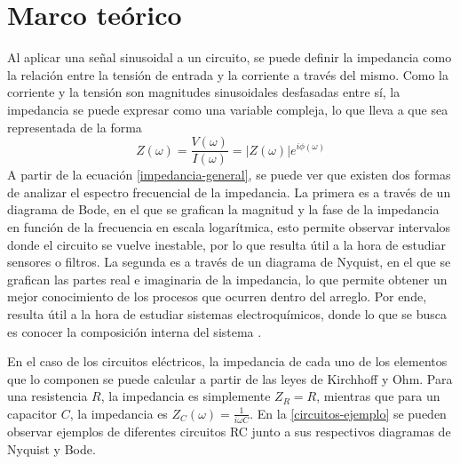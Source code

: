 \section{Marco teórico}
        Al aplicar una señal sinusoidal a un circuito, se puede definir la impedancia como la relación entre la tensión de entrada y la corriente a través del mismo. Como la corriente y la tensión son magnitudes sinusoidales desfasadas entre sí, la impedancia se puede expresar como una variable compleja, lo que lleva a que sea representada de la forma
        \begin{equation}
            Z(\omega) = \frac{V(\omega)}{I(\omega)} = |Z(\omega)|e^{i\phi(\omega)}
            \label{impedancia-general}
            \end{equation}
        A partir de la ecuación \eqref{impedancia-general}, se puede ver que existen dos formas de analizar el espectro frecuencial de la impedancia. La primera es a través de un diagrama de Bode, en el que se grafican la magnitud y la fase de la impedancia en función de la frecuencia en escala logarítmica, esto permite observar intervalos donde el circuito se vuelve inestable, por lo que resulta útil a la hora de estudiar sensores o filtros. La segunda es a través de un diagrama de Nyquist, en el que se grafican las partes real e imaginaria de la impedancia, lo que permite obtener un mejor conocimiento de los procesos que ocurren dentro del arreglo. Por ende, resulta útil a la hora de estudiar sistemas electroquímicos, donde lo que se busca es conocer la composición interna del sistema \cite{modeling}.

        En el caso de los circuitos eléctricos, la impedancia de cada uno de los elementos que lo componen se puede calcular a partir de las leyes de Kirchhoff y Ohm. Para una resistencia \(R\), la impedancia es simplemente \(Z_R = R\), mientras que para un capacitor \(C\), la impedancia es \(Z_C(\omega) = \frac{1}{i\omega C}\). En la \autoref{circuitos-ejemplo} se pueden observar ejemplos de diferentes circuitos RC junto a sus respectivos diagramas de Nyquist y Bode.


